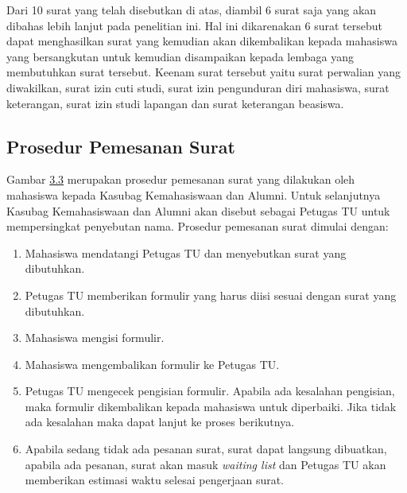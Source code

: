 Dari 10 surat yang telah disebutkan di atas, diambil 6 surat saja yang akan dibahas lebih lanjut pada penelitian ini. Hal ini dikarenakan 6 surat tersebut dapat menghasilkan surat yang kemudian akan dikembalikan kepada mahasiswa yang bersangkutan untuk kemudian disampaikan kepada lembaga yang membutuhkan surat tersebut. Keenam surat tersebut yaitu surat perwalian yang diwakilkan, surat izin cuti studi, surat izin pengunduran diri mahasiswa, surat keterangan, surat izin studi lapangan dan surat keterangan beasiswa.

\subsection{Prosedur Pemesanan Surat}
\label{sec:prosedur_pemesanan_surat}
Gambar \hyperlink{pemesanan_terkini}{3.3} merupakan prosedur pemesanan surat yang dilakukan oleh mahasiswa kepada Kasubag Kemahasiswaan dan Alumni. Untuk selanjutnya Kasubag Kemahasiswaan dan Alumni akan disebut sebagai Petugas TU untuk mempersingkat penyebutan nama. Prosedur pemesanan surat dimulai dengan:
\begin{enumerate}
	\item Mahasiswa mendatangi Petugas TU dan menyebutkan surat yang dibutuhkan.
	\item Petugas TU memberikan formulir yang harus diisi sesuai dengan surat yang dibutuhkan.
	\item Mahasiswa mengisi formulir.
	\item Mahasiswa mengembalikan formulir ke Petugas TU.
	\item Petugas TU mengecek pengisian formulir. Apabila ada kesalahan pengisian, maka formulir dikembalikan kepada mahasiswa untuk diperbaiki. Jika tidak ada kesalahan maka dapat lanjut ke proses berikutnya.
	\item Apabila sedang tidak ada pesanan surat, surat dapat langsung dibuatkan, apabila ada pesanan, surat akan masuk \textit{waiting list} dan Petugas TU akan memberikan estimasi waktu selesai pengerjaan surat.
\end{enumerate}

